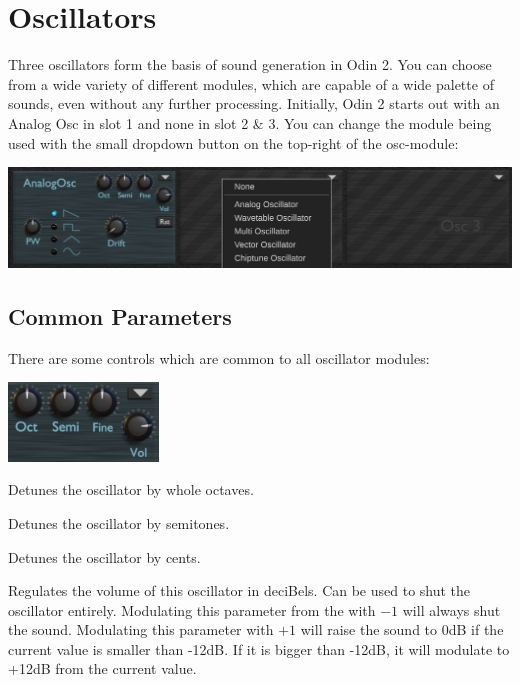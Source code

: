 \chapter{Oscillators}
Three oscillators form the basis of sound generation in Odin 2. You can choose from a wide variety of different modules, which are capable of a wide palette of sounds, even without any further processing. Initially, Odin 2 starts out with an Analog Osc in slot 1 and none in slot 2 \& 3. You can change the module being used with the small dropdown button on the top-right of the osc-module:
\vspace{5mm}

\includegraphics[width=\textwidth]{graphics/osc_selection.png}

\section{Common Parameters}
There are some controls which are common to all oscillator modules:

\begin{center}
    \includegraphics[width=0.3\textwidth]{graphics/osc_common.png}
\end{center}

Detunes the oscillator by whole octaves.

Detunes the oscillator by semitones.

Detunes the oscillator by cents.

Regulates the volume of this oscillator in deciBels. Can be used to shut the oscillator entirely. Modulating this parameter from the \modmatrix  with $-1$ will always shut the sound. Modulating this parameter with $+1$ will raise the sound to 0dB if the current value is smaller than -12dB. If it is bigger than -12dB, it will modulate to +12dB from the current value.

